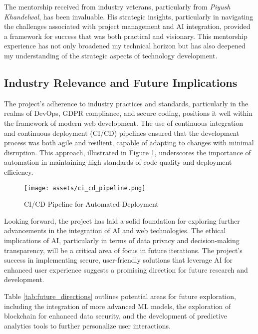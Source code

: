 The mentorship received from industry veterans, particularly from \textit{Piyush Khandelwal}, has been invaluable. His strategic insights, particularly in navigating the challenges associated with project management and \gls{AI} integration, provided a framework for success that was both practical and visionary. This mentorship experience has not only broadened my technical horizon but has also deepened my understanding of the strategic aspects of technology development.

\subsection{Industry Relevance and Future Implications}
The project's adherence to industry practices and standards, particularly in the realms of \gls{DevOps}, \gls{GDPR} compliance, and secure coding, positions it well within the framework of modern web development. The use of continuous integration and continuous deployment (CI/CD) pipelines ensured that the development process was both agile and resilient, capable of adapting to changes with minimal disruption. This approach, illustrated in Figure \ref{fig:ci_cd_pipeline}, underscores the importance of automation in maintaining high standards of code quality and deployment efficiency.

\begin{figure}[h]
    \centering
    \texttt{[image: assets/ci\_cd\_pipeline.png]}
    \caption{CI/CD Pipeline for Automated Deployment}
    \label{fig:ci_cd_pipeline}
\end{figure}

Looking forward, the project has laid a solid foundation for exploring further advancements in the integration of \gls{AI} and web technologies. The ethical implications of AI, particularly in terms of data privacy and decision-making transparency, will be a critical area of focus in future iterations. The project's success in implementing secure, user-friendly solutions that leverage AI for enhanced user experience suggests a promising direction for future research and development.

Table \ref{tab:future_directions} outlines potential areas for future exploration, including the integration of more advanced \gls{ML} models, the exploration of blockchain for enhanced data security, and the development of predictive analytics tools to further personalize user interactions.

